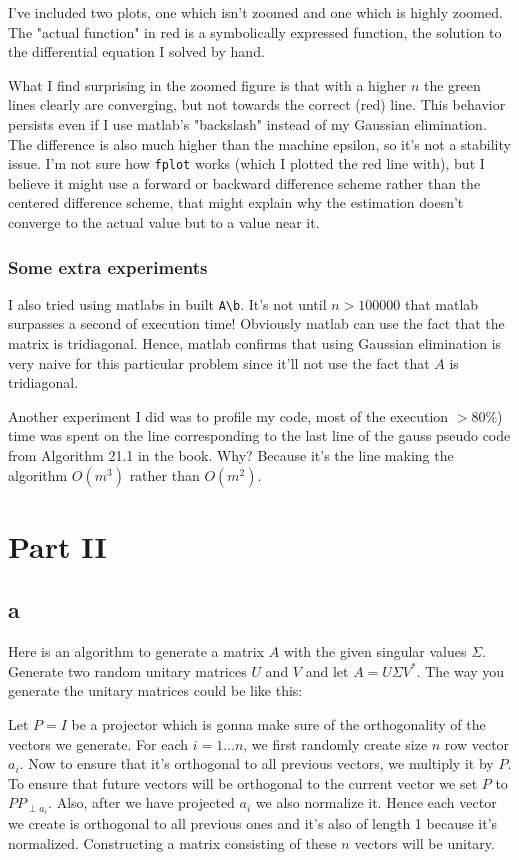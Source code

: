 \documentclass[a4paper,11pt]{article}
\begin{document}
I've included two plots, one which isn't zoomed and one which is highly
zoomed. The "actual function" in red is a symbolically expressed
function, the solution to the differential equation I solved by hand.

What I find surprising in the zoomed figure is that with a higher $n$
the green lines clearly are converging, but not towards the correct (red)
line.  This behavior persists even if I use matlab's "backslash" instead
of my Gaussian elimination. The difference is also much higher than the
machine epsilon, so it's not a stability issue. I'm not sure how
\texttt{fplot} works (which I plotted the red line with), but I believe
it might use a forward or backward difference scheme rather than the
centered difference scheme, that might explain why the estimation
doesn't converge to the actual value but to a value near it.

\subsubsection{Some extra experiments}

I also tried using matlabs in built \texttt{A\textbackslash b}. It's not until
$n>100000$ that matlab surpasses a second of execution time! Obviously
matlab can use the fact that the matrix is tridiagonal. Hence, matlab
confirms that using Gaussian elimination is very naive for this
particular problem since it'll not use the fact that $A$ is tridiagonal.

Another experiment I did was to profile my code, most of the execution
$>80\%$) time was spent on the line corresponding to the last line of
the gauss pseudo code from Algorithm 21.1 in the book.  Why? Because
it's the line making the algorithm $O(m^3)$ rather than $O(m^2)$.

\section{Part II}

\subsection{a}

Here is an algorithm to generate a matrix $A$ with the given singular values
$\Sigma$. Generate two random unitary matrices $U$ and $V$ and let $A = U
\Sigma V^*$. The way you generate the unitary matrices could be like this:

Let $P=I$ be a projector which is gonna make sure of the orthogonality of the
vectors we generate. For each $i=1 \dots n$, we first randomly create size $n$
row vector $a_i$. Now to ensure that it's orthogonal to all previous vectors,
we multiply it by $P$. To ensure that future vectors will be orthogonal to the
current vector we set $P$ to $P P_{\perp a_i}$. Also, after we have projected
$a_i$ we also normalize it. Hence each vector we create is orthogonal to all
previous ones and it's also of length 1 because it's normalized. Constructing
a matrix consisting of these $n$ vectors will be unitary.
\end{document}
